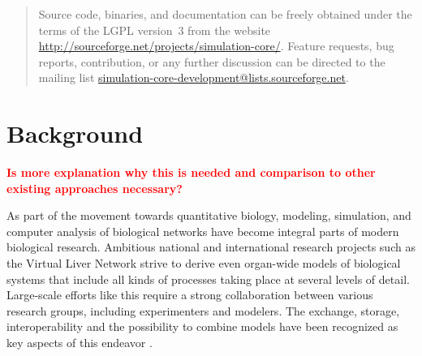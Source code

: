 \documentclass[10pt]{bmc_article}
\newenvironment{bmcformat}{\baselineskip20pt\sloppy\setboolean{publ}{false}}{\baselineskip20pt\sloppy}
\newcommand{\TODO}[1]{\textcolor{red}{\textbf{#1}}}
\begin{document}
\begin{bmcformat}
\begin{abstract}
Source code, binaries, and documentation can be freely obtained under the terms
of the LGPL version~3 from the website
\href{http://sourceforge.net/projects/simulation-core/}{http://sourceforge.net/projects/simulation-core/}.
Feature requests, bug reports, contribution, or any further discussion can be directed to the mailing list
\href{mailto:simulation-core-development@lists.sourceforge.net}{simulation-core-development@lists.sourceforge.net}.
%
\end{abstract}









\section*{Background}

\TODO{Is more explanation why this is needed and comparison to other existing
approaches necessary?}

As part of the movement towards quantitative biology, modeling, 
simulation, and computer analysis of biological networks have become integral
parts of modern biological research. Ambitious national and international
research projects such as the Virtual Liver Network \cite{Holzhuetter2012}
strive to derive even organ-wide models of biological systems that include all
kinds of processes taking place at several levels of detail. Large-scale efforts
like this require a strong collaboration between various research groups,
including experimenters and modelers. The exchange, storage, interoperability
and the possibility to combine models have been recognized as key aspects of
this endeavor \cite{Liebermeister2009sta}.


\end{bmcformat}
\end{document}
